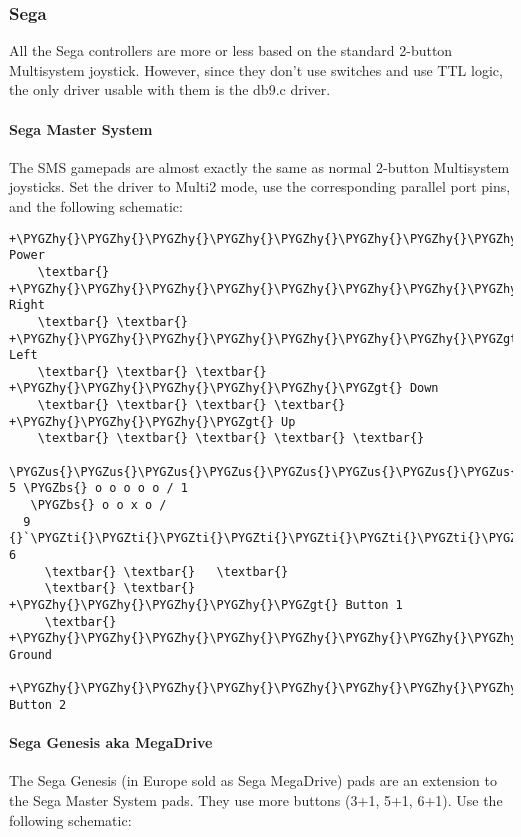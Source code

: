 \documentclass[a4paper,8pt,english]{sphinxmanual}
\def\PYGZbs{\char`\\}
\def\PYGZus{\char`\_}
\def\PYGZgt{\char`\>}
\def\PYGZhy{\char`\-}
\def\PYGZsq{\char`\'}
\def\PYGZti{\char`\~}
\renewcommand\PYGZsq{\textquotesingle}
\begin{document}
\subsubsection{Sega}
\label{input/devices/joystick-parport:sega}
All the Sega controllers are more or less based on the standard 2-button
Multisystem joystick. However, since they don't use switches and use TTL
logic, the only driver usable with them is the db9.c driver.


\paragraph{Sega Master System}
\label{input/devices/joystick-parport:sega-master-system}
The SMS gamepads are almost exactly the same as normal 2-button
Multisystem joysticks. Set the driver to Multi2 mode, use the corresponding
parallel port pins, and the following schematic:

\begin{Verbatim}[commandchars=\\\{\}]
    +\PYGZhy{}\PYGZhy{}\PYGZhy{}\PYGZhy{}\PYGZhy{}\PYGZhy{}\PYGZhy{}\PYGZhy{}\PYGZhy{}\PYGZhy{}\PYGZhy{}\PYGZgt{} Power
    \textbar{} +\PYGZhy{}\PYGZhy{}\PYGZhy{}\PYGZhy{}\PYGZhy{}\PYGZhy{}\PYGZhy{}\PYGZhy{}\PYGZhy{}\PYGZgt{} Right
    \textbar{} \textbar{} +\PYGZhy{}\PYGZhy{}\PYGZhy{}\PYGZhy{}\PYGZhy{}\PYGZhy{}\PYGZhy{}\PYGZgt{} Left
    \textbar{} \textbar{} \textbar{} +\PYGZhy{}\PYGZhy{}\PYGZhy{}\PYGZhy{}\PYGZhy{}\PYGZgt{} Down
    \textbar{} \textbar{} \textbar{} \textbar{} +\PYGZhy{}\PYGZhy{}\PYGZhy{}\PYGZgt{} Up
    \textbar{} \textbar{} \textbar{} \textbar{} \textbar{}
  \PYGZus{}\PYGZus{}\PYGZus{}\PYGZus{}\PYGZus{}\PYGZus{}\PYGZus{}\PYGZus{}\PYGZus{}\PYGZus{}\PYGZus{}\PYGZus{}\PYGZus{}
5 \PYGZbs{} o o o o o / 1
   \PYGZbs{} o o x o /
  9 {}`\PYGZti{}\PYGZti{}\PYGZti{}\PYGZti{}\PYGZti{}\PYGZti{}\PYGZti{}\PYGZsq{} 6
     \textbar{} \textbar{}   \textbar{}
     \textbar{} \textbar{}   +\PYGZhy{}\PYGZhy{}\PYGZhy{}\PYGZhy{}\PYGZgt{} Button 1
     \textbar{} +\PYGZhy{}\PYGZhy{}\PYGZhy{}\PYGZhy{}\PYGZhy{}\PYGZhy{}\PYGZhy{}\PYGZhy{}\PYGZgt{} Ground
     +\PYGZhy{}\PYGZhy{}\PYGZhy{}\PYGZhy{}\PYGZhy{}\PYGZhy{}\PYGZhy{}\PYGZhy{}\PYGZhy{}\PYGZhy{}\PYGZgt{} Button 2
\end{Verbatim}


\paragraph{Sega Genesis aka MegaDrive}
\label{input/devices/joystick-parport:sega-genesis-aka-megadrive}
The Sega Genesis (in Europe sold as Sega MegaDrive) pads are an extension
to the Sega Master System pads. They use more buttons (3+1, 5+1, 6+1).  Use
the following schematic:
\end{document}
